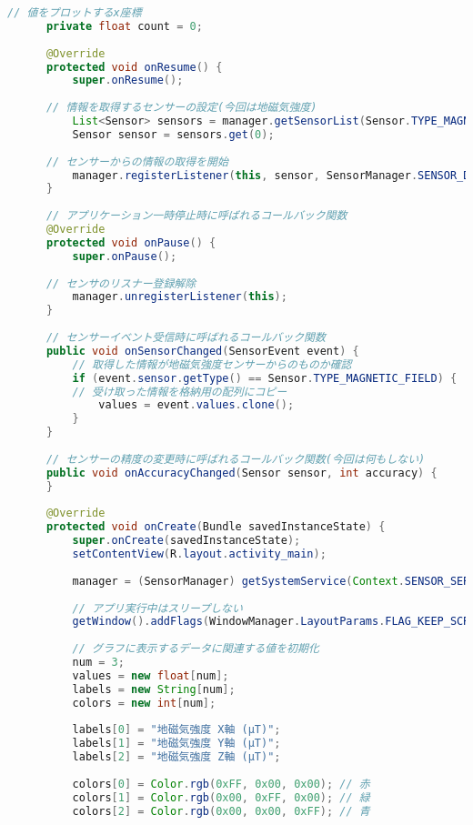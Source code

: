 \documentclass[dvipdfmx,autodetect-engine,titlepage]{jsarticle}
\begin{document}
\begin{lstlisting}[language=java]
      // 値をプロットするx座標
      private float count = 0;
  
      @Override
      protected void onResume() {
          super.onResume();
  
      // 情報を取得するセンサーの設定(今回は地磁気強度)
          List<Sensor> sensors = manager.getSensorList(Sensor.TYPE_MAGNETIC_FIELD);
          Sensor sensor = sensors.get(0);
  
      // センサーからの情報の取得を開始
          manager.registerListener(this, sensor, SensorManager.SENSOR_DELAY_UI);
      }
  
      // アプリケーション一時停止時に呼ばれるコールバック関数
      @Override
      protected void onPause() {
          super.onPause();
  
      // センサのリスナー登録解除
          manager.unregisterListener(this);
      }
  
      // センサーイベント受信時に呼ばれるコールバック関数
      public void onSensorChanged(SensorEvent event) {
          // 取得した情報が地磁気強度センサーからのものか確認
          if (event.sensor.getType() == Sensor.TYPE_MAGNETIC_FIELD) {
          // 受け取った情報を格納用の配列にコピー
              values = event.values.clone();
          }
      }
  
      // センサーの精度の変更時に呼ばれるコールバック関数(今回は何もしない)
      public void onAccuracyChanged(Sensor sensor, int accuracy) {
      }
  
      @Override
      protected void onCreate(Bundle savedInstanceState) {
          super.onCreate(savedInstanceState);
          setContentView(R.layout.activity_main);
  
          manager = (SensorManager) getSystemService(Context.SENSOR_SERVICE);
  
          // アプリ実行中はスリープしない
          getWindow().addFlags(WindowManager.LayoutParams.FLAG_KEEP_SCREEN_ON);
  
          // グラフに表示するデータに関連する値を初期化
          num = 3;
          values = new float[num];
          labels = new String[num];
          colors = new int[num];
  
          labels[0] = "地磁気強度 X軸 (μT)";
          labels[1] = "地磁気強度 Y軸 (μT)";
          labels[2] = "地磁気強度 Z軸 (μT)";
  
          colors[0] = Color.rgb(0xFF, 0x00, 0x00); // 赤
          colors[1] = Color.rgb(0x00, 0xFF, 0x00); // 緑
          colors[2] = Color.rgb(0x00, 0x00, 0xFF); // 青
  

\end{lstlisting}
\end{document}
